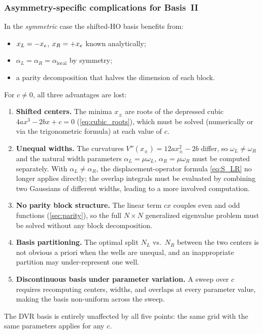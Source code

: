 \subsubsection{Asymmetry-specific complications for Basis~II}

In the \emph{symmetric} case the shifted-HO basis benefits from:
\begin{itemize}
  \item $x_L = -x_e$, $x_R = +x_e$ known analytically;
  \item $\alpha_L = \alpha_R = \alpha_{\text{local}}$ by symmetry;
  \item a parity decomposition that halves the dimension of each block.
\end{itemize}

For $c \neq 0$, all three advantages are lost:
\begin{enumerate}
  \item \textbf{Shifted centers.}  The minima $x_\pm$ are roots of the depressed cubic
    $4ax^3 - 2bx + c = 0$ (\cref{eq:cubic_roots}), which must be solved (numerically
    or via the trigonometric formula) at each value of $c$.
  \item \textbf{Unequal widths.}  The curvatures $V''(x_\pm) = 12ax_\pm^2 - 2b$ differ,
    so $\omega_L \neq \omega_R$ and the natural width parameters $\alpha_L = \mu\omega_L$,
    $\alpha_R = \mu\omega_R$ must be computed separately.  With $\alpha_L \neq \alpha_R$,
    the displacement-operator formula \cref{eq:S_LR} no longer applies directly; the
    overlap integrals must be evaluated by combining two Gaussians of different widths,
    leading to a more involved computation.
  \item \textbf{No parity block structure.}  The linear term $cx$ couples even and odd
    functions (\cref{sec:parity}), so the full $N\times N$ generalized eigenvalue problem
    must be solved without any block decomposition.
  \item \textbf{Basis partitioning.}  The optimal split $N_L$ vs.\ $N_R$ between the two
    centers is not obvious a priori when the wells are unequal, and an inappropriate
    partition may under-represent one well.
  \item \textbf{Discontinuous basis under parameter variation.}  A sweep over $c$ requires
    recomputing centers, widths, and overlaps at every parameter value, making the basis
    non-uniform across the sweep.
\end{enumerate}

The DVR basis is entirely unaffected by all five points: the same grid with the same
parameters applies for any $c$.

